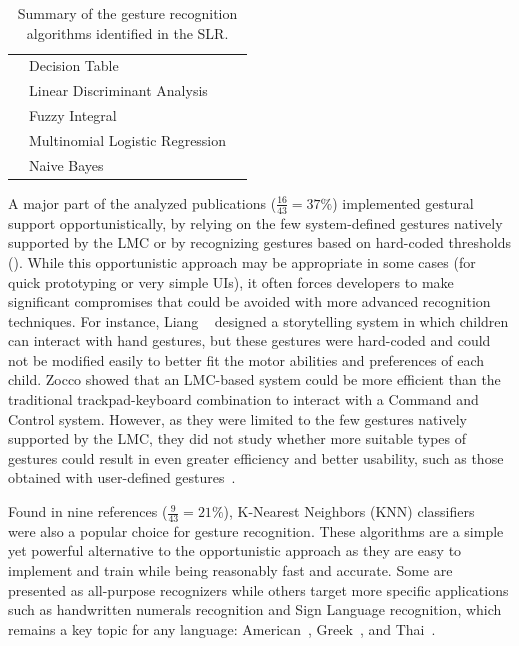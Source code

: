 \begin{table}[hbt]
{\begin{tabular}{lll}
         & Decision Table & \cite{Li:2017c} \\
         & Linear Discriminant Analysis & \cite{Jiang:2018} \\
         & Fuzzy Integral & \cite{Li:2017c} \\
         & Multinomial Logistic Regression & \cite{Kiselev:2019} \\
         & Naive Bayes & \cite{Preventis:2014} \\
        \bottomrule
    \end{tabular}
    }
    \caption{Summary of the gesture recognition algorithms identified in the SLR.}
    \label{tbl:state_of_the_art:lmc:algorithms}
\end{table}

A major part of the analyzed publications ($\frac{16}{43}{=}37\%$) implemented gestural support opportunistically, \ie by relying on the few system-defined gestures natively supported by the LMC or by recognizing gestures based on hard-coded thresholds (\eg \cite{Cai:2019,Galea:2018,Zhou:2018b}). While this opportunistic approach may be appropriate in some cases (\eg for quick prototyping\cite{Anthony:2012} or very simple UIs), it often forces developers to make significant compromises that could be avoided with more advanced recognition techniques. For instance, Liang \etal~\cite{Liang:2017} designed a storytelling system in which children can interact with hand gestures, but these gestures were hard-coded and could not be modified easily to better fit the motor abilities and preferences of each child. Zocco \etal\cite{Zocco:2015} showed that an LMC-based system could be more efficient than the traditional trackpad-keyboard combination to interact with a Command and Control system. However, as they were limited to the few gestures natively supported by the LMC, they did not study whether more suitable types of gestures could result in even greater efficiency and better usability, such as those obtained with user-defined gestures~\cite{Grijincu:2014}.

Found in nine references ($\frac{9}{43}{=}21\%$), K-Nearest Neighbors (KNN) classifiers~\cite{Duda:2000} were also a popular choice for gesture recognition. These algorithms are a simple yet powerful alternative to the opportunistic approach as they are easy to implement and train while being reasonably fast and accurate. Some are presented as all-purpose recognizers \cite{Caputo:2017,Taranta:2017} while others target more specific applications such as handwritten numerals recognition \cite{Chiang:2017} and Sign Language recognition, which remains a key topic for any language: American~\cite{Ferreira:2019,Kumar:2017b,Mapari:2016,Schioppo:2019}, Greek~\cite{Simos:2016}, and Thai~\cite{Thaweesitthichat:2018}.

